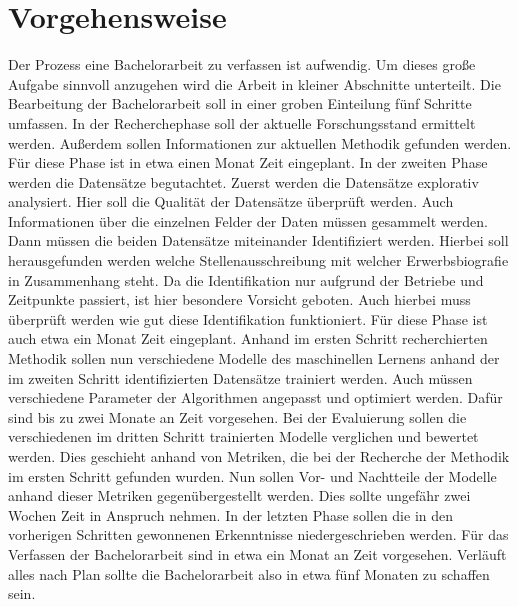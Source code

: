 \documentclass[
    11pt,
    a4paper,
    egregdoesnotlikesansseriftitles,
    toc=chapterentrywithdots,
    oneside,openright,
    titlepage,
    parskip=half,
    headings=normal,  %
    listof=totoc,
    bibliography=totoc,
    index=totoc,
    captions=tableheading,  %
    chapterprefix,
    listof=flat,
    final
]{scrbook}
\begin{document}
{\let\clearpage\relax \chapter{Vorgehensweise}}
Der Prozess eine Bachelorarbeit zu verfassen ist aufwendig. Um dieses große Aufgabe sinnvoll anzugehen wird die Arbeit in kleiner Abschnitte unterteilt.
Die Bearbeitung der Bachelorarbeit soll in einer groben Einteilung fünf Schritte umfassen.
\newline
In der Recherchephase soll der aktuelle Forschungsstand ermittelt werden. Außerdem sollen Informationen zur aktuellen Methodik gefunden werden. Für diese Phase ist in etwa einen Monat Zeit eingeplant.
\newline
In der zweiten Phase werden die Datensätze begutachtet. Zuerst werden die Datensätze explorativ analysiert. Hier soll die Qualität der Datensätze überprüft werden. Auch Informationen über die einzelnen Felder der Daten müssen gesammelt werden. Dann müssen die beiden Datensätze miteinander Identifiziert werden. Hierbei soll herausgefunden werden welche Stellenausschreibung mit welcher Erwerbsbiografie in Zusammenhang steht. Da die Identifikation nur aufgrund der Betriebe und Zeitpunkte passiert, ist hier besondere Vorsicht geboten. Auch hierbei muss überprüft werden wie gut diese Identifikation funktioniert. Für diese Phase ist auch etwa ein Monat Zeit eingeplant.
\newline
Anhand im ersten Schritt recherchierten Methodik sollen nun verschiedene Modelle des maschinellen Lernens anhand der im zweiten Schritt identifizierten Datensätze trainiert werden. Auch müssen verschiedene Parameter der Algorithmen angepasst und optimiert werden. Dafür sind bis zu zwei Monate an Zeit vorgesehen.
\newline 
Bei der Evaluierung sollen die verschiedenen im dritten Schritt trainierten Modelle verglichen und bewertet werden. Dies geschieht anhand von Metriken, die bei der Recherche der Methodik im ersten Schritt gefunden wurden. Nun sollen Vor- und Nachtteile der Modelle anhand dieser Metriken gegenübergestellt werden. Dies sollte ungefähr zwei Wochen Zeit in Anspruch nehmen.
\newline
In der letzten Phase sollen die in den vorherigen Schritten gewonnenen Erkenntnisse niedergeschrieben werden. Für das Verfassen der Bachelorarbeit sind in etwa ein Monat an Zeit vorgesehen.
\newline
Verläuft alles nach Plan sollte die Bachelorarbeit also in etwa fünf Monaten zu schaffen sein.

\backmatter

\cleardoublepage



\printnoidxglossaries
  \renewcommand\bibname{Literaturverzeichnis} 


\end{document}

